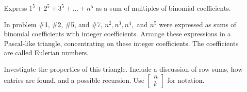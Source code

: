 \documentclass[10pt,]{book}
\theoremstyle{plain}
\theoremstyle{definition}
\theoremstyle{definition}
\theoremstyle{definition}
\theoremstyle{definition}
\numberwithin{equation}{chapter}
\begin{document}
\begin{divisionexercise}{9}\hypertarget{exercise-164}{}
\hypertarget{p-1225}{}%
Express \(1^{5} + 2^{5} + 3^{5} + \ldots + n^{5}\) as a sum of multiples of binomial coefficients.%
\end{divisionexercise}%
\begin{divisionexercise}{10}\hypertarget{exercise-165}{}
\hypertarget{p-1226}{}%
In problem \#1, \#2, \#5, and \#7, \(n^{2},n^{3},n^{4},\) and \(n^{5}\) were expressed as sums of binomial coefficients with integer coefficients. Arrange these expressions in a Pascal-like triangle, concentrating on these integer coefficients. The coefficients are called Eulerian numbers.%
\end{divisionexercise}%
\begin{divisionexercise}{11}\hypertarget{exercise-166}{}
\hypertarget{p-1227}{}%
Investigate the properties of this triangle. Include a discussion of row sums, how entries are found, and a possible recursion. Use \(\begin{bmatrix}
n\\
k
\end{bmatrix}\) for notation.%
\end{divisionexercise}%
\typeout{************************************************}
\typeout{************************************************}
\end{document}
